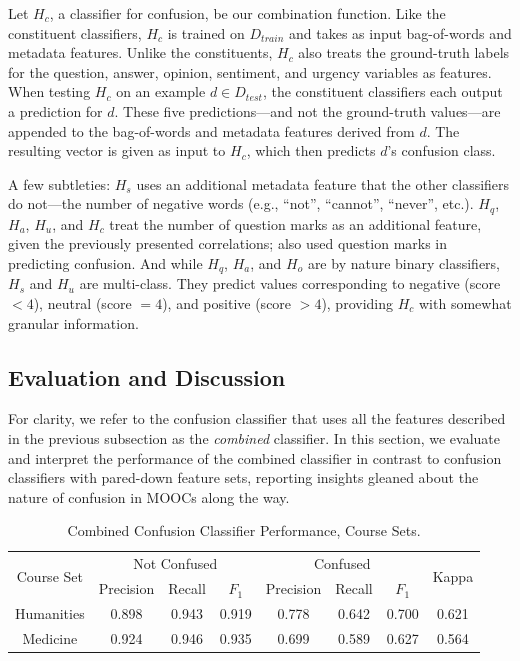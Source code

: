 \documentclass{edm_template}
\begin{document}
Let $H_{c}$, a classifier for confusion, be our combination function. Like the constituent classifiers, $H_{c}$ is trained on $D_{train}$ and takes as input bag-of-words and metadata features. Unlike the constituents, $H_{c}$ also treats the ground-truth labels for the question, answer, opinion, sentiment, and urgency variables as features. When testing $H_{c}$ on an example $d \in D_{test}$, the constituent classifiers each output a prediction for $d$. These five predictions---and not the ground-truth values---are appended to the bag-of-words and metadata features derived from $d$. The resulting vector is given as input to $H_{c}$, which then predicts $d$'s confusion class.

A few subtleties: $H_{s}$ uses an additional metadata feature that the other classifiers do not---the number of negative words (e.g., ``not'', ``cannot'', ``never'', etc.). $H_{q}$, $H_{a}$, $H_{u}$, and $H_{c}$ treat the number of question marks as an additional feature, given the previously presented correlations; \cite{wen2015confusion} also used question marks in predicting confusion. And while $H_{q}$, $H_{a}$, and $H_{o}$ are by nature binary classifiers, $H_{s}$ and $H_{u}$ are multi-class. They predict values corresponding to negative (score $< 4$), neutral (score $= 4$), and positive (score $> 4$), providing $H_{c}$ with somewhat granular information.

\subsection{Evaluation and Discussion}
For clarity, we refer to the confusion classifier that uses all the features
described in the previous subsection as the \emph{combined} classifier. In this section, we evaluate and interpret the performance of the combined classifier in contrast to confusion classifiers with pared-down feature sets, reporting insights gleaned about the nature of confusion in MOOCs along the way. 

\begin{table}[htp!]
    \centering
    \begin{tabular}{|c|c c c|c c c|c|}
    \hline
    \multirow{2}{*}{Course Set} & \multicolumn{3}{c|}{Not Confused} & \multicolumn{3}{c|}{Confused}  & \multirow{2}{*}{Kappa} \\ \cline{2-7}
                                &  Precision & Recall & $F_{1}$     &  Precision & Recall & $F_{1}$  &       \\ \hline
    Humanities                  & 0.898      & 0.943    & 0.919     & 0.778      & 0.642  & 0.700    & 0.621  \\ \hline
    Medicine                    & 0.924      & 0.946    & 0.935     & 0.699      & 0.589  & 0.627    & 0.564  \\ \hline

    \end{tabular}
    \caption{\textnormal{
       Combined Confusion Classifier Performance, Course Sets.
    }} %
    \label{table:confusion_sets} %
\end{table}
\end{document}
